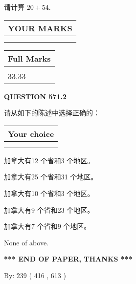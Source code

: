 \documentclass{ctexart}
\begin{document}
  
 
请计算 $ %
20 +  %
54 $.
 

 

 
  
\vspace{0.2in}
  
\noindent\begin{tabular}{|l|}
\hline
 YOUR MARKS  \\
\hline
 \\ 
 \\ 
\hline
\end{tabular}
\hspace{0.05in} \begin{tabular}{|l|}
\hline
 Full Marks  \\
\hline
 \\ 
33.33 \\
\hline
\end{tabular}
{\textbf{\Large{QUESTION
571.2 
}}}
  
  
请从如下的陈述中选择正确的：
  
  
\noindent\hspace{3.0in} \begin{tabular}{|l|}
\hline
Your choice \\
\hline
 \\ 
 \\ 
\hline
\end{tabular}
  
  
 
 
加拿大有12 个省和3 个地区。
 
 
加拿大有25 个省和31 个地区。
 
 
加拿大有10 个省和3 个地区。
 
 
加拿大有9 个省和23 个地区。
 
 
加拿大有7 个省和9 个地区。
 
 
 None of above.
 
 
   
   
 \vspace{0.2in}
 
   
   
   
   
\vspace{1.0in} 
{\textbf{\large{ *** END OF PAPER, THANKS *** }}} 
   
   
\hspace{1.0in} By: 
 239 ( 416 ,  613 )
   
\end{document}
